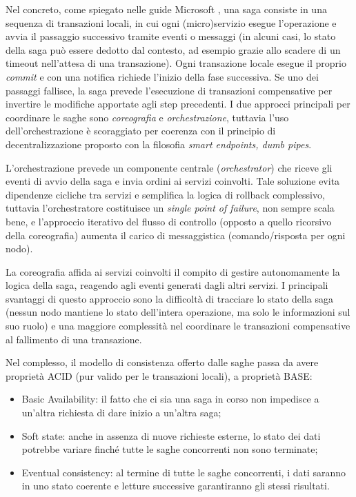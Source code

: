 Nel concreto, come spiegato nelle guide Microsoft \cite{Microsoft_Saga_Pattern}, una saga consiste in una sequenza di transazioni locali, in cui ogni (micro)servizio esegue l’operazione e avvia il passaggio successivo tramite eventi o messaggi (in alcuni casi, lo stato della saga può essere dedotto dal contesto, ad esempio grazie allo scadere di un timeout nell'attesa di una transazione). Ogni transazione locale esegue il proprio \emph{commit} e con una notifica richiede l'inizio della fase successiva. Se uno dei passaggi fallisce, la saga prevede l'esecuzione di transazioni compensative per invertire le modifiche apportate agli step precedenti.
I due approcci principali per coordinare le saghe sono \emph{coreografia} e \emph{orchestrazione}, tuttavia l'uso dell'orchestrazione è scoraggiato per coerenza con il principio di decentralizzazione proposto con la filosofia \emph{smart endpoints, dumb pipes}.

L'orchestrazione prevede un componente centrale (\emph{orchestrator}) che riceve gli eventi di avvio della saga e invia ordini ai servizi coinvolti. Tale soluzione evita dipendenze cicliche tra servizi e semplifica la logica di rollback complessivo, tuttavia l'orchestratore costituisce un \emph{single point of failure}, non sempre scala bene, e l'approccio iterativo del flusso di controllo (opposto a quello ricorsivo della coreografia) aumenta il carico di messaggistica (comando/risposta per ogni nodo).

La coreografia affida ai servizi coinvolti il compito di gestire autonomamente la logica della saga, reagendo agli eventi generati dagli altri servizi. I principali svantaggi di questo approccio sono la difficoltà di tracciare lo stato della saga (nessun nodo mantiene lo stato dell'intera operazione, ma solo le informazioni sul suo ruolo) e una maggiore complessità nel coordinare le transazioni compensative al fallimento di una transazione.

Nel complesso, il modello di consistenza offerto dalle saghe passa da avere proprietà ACID (pur valido per le transazioni locali), a proprietà BASE:
\begin{itemize}
  \item Basic Availability: il fatto che ci sia una saga in corso non impedisce a un'altra richiesta di dare inizio a un'altra saga;
  \item Soft state: anche in assenza di nuove richieste esterne, lo stato dei dati potrebbe variare finché tutte le saghe concorrenti non sono terminate;
  \item Eventual consistency: al termine di tutte le saghe concorrenti, i dati saranno in uno stato coerente e letture successive garantiranno gli stessi risultati.
\end{itemize}

